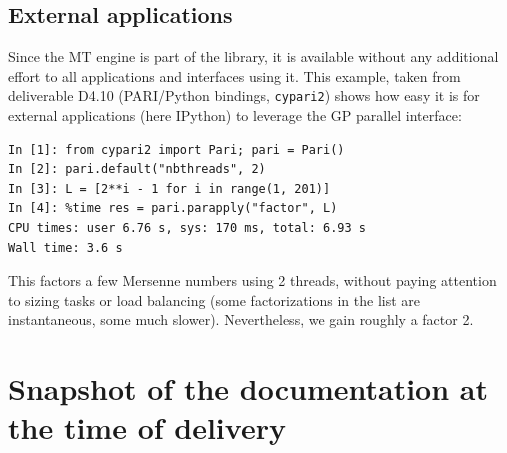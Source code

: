 \documentclass{deliverablereport}
\begin{document}
\subsection{External applications}

Since the MT engine is part of the \Pari library, it is available
without any additional effort to all applications and interfaces using it.
This example, taken from deliverable D4.10
(PARI/Python bindings, \texttt{cypari2}) shows how easy it is for
external applications (here IPython) to leverage the GP parallel interface:

\begin{verbatim}
In [1]: from cypari2 import Pari; pari = Pari()
In [2]: pari.default("nbthreads", 2)
In [3]: L = [2**i - 1 for i in range(1, 201)]
In [4]: %time res = pari.parapply("factor", L)
CPU times: user 6.76 s, sys: 170 ms, total: 6.93 s
Wall time: 3.6 s
\end{verbatim}

This factors a few Mersenne numbers using 2 threads, without paying attention
to sizing tasks or load balancing (some factorizations in the list are
instantaneous, some much slower). Nevertheless, we gain roughly a factor 2.

\bigskip
\bigskip

\appendix
\section{Snapshot of the documentation at the time of delivery}


\end{document}
